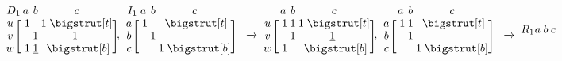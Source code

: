 \documentclass[sn-mathphys]{sn-jnl}
\newcommand\topstrut[1][1.0ex]{\setlength\bigstrutjot{#1}{\bigstrut[t]}}
\newcommand\botstrut[1][0.9ex]{\setlength\bigstrutjot{#1}{\bigstrut[b]}}
\begin{document}
$$
	\def\rowsp{0.4em}
	\def\arraystretch{0.95}
	\makeatletter\setlength\BA@colsep{1.2pt}\makeatother
	\begin{blockarray}{cccc}{D_1}
	 \kern-0.2em & a & b & c  \\
		\begin{block}{c[ccc]}
  		u \kern\rowsp  & \; 1 &    &  1 \; \topstrut \\
  		v \kern\rowsp & \;     &  1 & 1 \; \\
  		w \kern\rowsp & \; 1 &  \underline{1} &    \; \botstrut \\
		\end{block}
	\end{blockarray}
	\; , \;
	\begin{blockarray}{cccc}{I_1}
	\kern-0.2em & a & b & c  \\
		\begin{block}{c[ccc]}
        a \kern\rowsp  & \; 1 &  &  \; \topstrut \\
  		b \kern\rowsp & \;  & 1 & \; \\
  		c \kern\rowsp & \;  &  & 1 \; \botstrut \\
		\end{block}
	\end{blockarray}
	\quad \xrightarrow{} \,
	\begin{blockarray}{cccc}{}
	\kern-0.2em & a & b & c  \\
		\begin{block}{c[ccc]}
  		u \kern\rowsp  & \; 1 & 1 & 1 \; \topstrut \\
  		v \kern\rowsp & \;     & 1 & \underline{1} \; \\
  		w \kern\rowsp & \; 1 &    &    \; \botstrut \\
		\end{block}
	\end{blockarray}
	\; , \;
	\begin{blockarray}{cccc}{}
	\kern-0.2em & a & b & c  \\
		\begin{block}{c[ccc]}
  		a \kern\rowsp  & \; 1 & 1 &    \; \topstrut \\
  		b \kern\rowsp & \;     & 1 &    \; \\
  		c \kern\rowsp & \;     &    & 1 \; \botstrut \\
		\end{block}
	\end{blockarray}
	\quad \xrightarrow{} \,
	\begin{blockarray}{cccc}{R_1}
	\kern-0.2em & a & b & c  \\

\end{blockarray}$$
\end{document}

